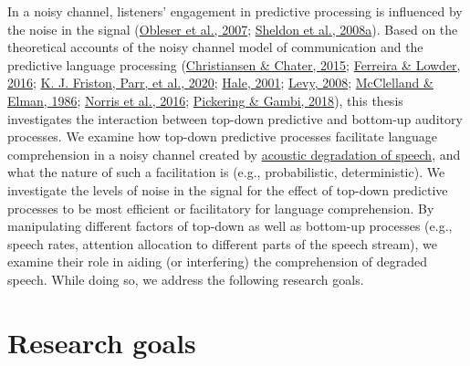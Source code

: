 \documentclass[a4paper, nobind]{templates/ociamthesis}
\begin{document}
In a noisy channel, listeners' engagement in predictive processing is influenced by the noise in the signal (\protect\hyperlink{ref-Obleser2007}{Obleser et al., 2007}; \protect\hyperlink{ref-Sheldon2008a}{Sheldon et al., 2008a}).
Based on the theoretical accounts of the noisy channel model of communication and the predictive language processing (\protect\hyperlink{ref-Christiansen2015}{Christiansen \& Chater, 2015}; \protect\hyperlink{ref-Ferreira2016}{Ferreira \& Lowder, 2016}; \protect\hyperlink{ref-Friston2020}{K. J. Friston, Parr, et al., 2020}; \protect\hyperlink{ref-Hale2001}{Hale, 2001}; \protect\hyperlink{ref-Levy2008}{Levy, 2008}; \protect\hyperlink{ref-Mcclelland1986}{McClelland \& Elman, 1986}; \protect\hyperlink{ref-Norris2016}{Norris et al., 2016}; \protect\hyperlink{ref-Pickering2018}{Pickering \& Gambi, 2018}),
this thesis investigates the interaction between top-down predictive and bottom-up auditory processes.
We examine how top-down predictive processes facilitate language comprehension in a noisy channel created by \protect\hyperlink{speech-processing}{acoustic degradation of speech},
and what the nature of such a facilitation is (e.g., probabilistic, deterministic).
We investigate the levels of noise in the signal for the effect of top-down predictive processes to be most efficient or facilitatory for language comprehension.
By manipulating different factors of top-down as well as bottom-up processes (e.g., speech rates, attention allocation to different parts of the speech stream),
we examine their role in aiding (or interfering) the comprehension of degraded speech.
While doing so, we address the following research goals.

\hypertarget{research-goals}{%
\section{Research goals}\label{research-goals}}
\end{document}
